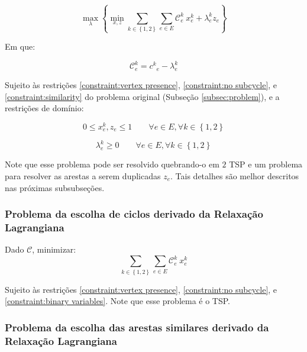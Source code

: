 \documentclass{article}
\newcommand{\subsecref}[1]{(Subseção \ref{#1})}
\newcommand{\Set}[1]{\ensuremath{\left\{#1\right\}}}
\newcommand{\Sum}[1]{\ensuremath{\displaystyle\sum\limits_{#1}}}
\newcommand{\edge}{\ensuremath{e}}
\newcommand{\edges}{\ensuremath{E}}
\newcommand{\ncycles}{2}
\newcommand{\allCycles}{\ensuremath{\Set{1, \ncycles}}}
\newcommand{\cycle}{\ensuremath{k}}
\newcommand{\cost}[1]{\ensuremath{c^{#1}}}
\newcommand{\costke}{\ensuremath{\cost{\cycle}_{\edge}}}
\newcommand{\Cost}{\ensuremath{\mathcal{C}}}
\newcommand{\Costke}{\ensuremath{\Cost^{\cycle}_{\edge}}}
\newcommand{\X}{\ensuremath{x}}
\newcommand{\xke}{\ensuremath{\X^{\cycle}_{\edge}}}
\newcommand{\Z}{\ensuremath{z}}
\newcommand{\ze}{\ensuremath{z_{\edge}}}
\newcommand{\lagrange}{\ensuremath{\lambda}}
\newcommand{\lagrangeke}{\ensuremath{\lagrange_{\edge}^{\cycle}}}
\begin{document}
\begin{equation}
    \label{eq:goal lagrangian}
	\max_{\lagrange}
	\left\{
		\min_{\X, \Z}
 		\Sum{\cycle \in \allCycles}
 		\Sum{\edge \in \edges}
 		\Costke \ \xke
 		+ \lagrangeke \ze
 	\right\}
\end{equation}

Em que:

\begin{equation}
	\Costke = \costke - \lagrangeke
\end{equation}

Sujeito às restrições \ref{constraint:vertex presence}, \ref{constraint:no subcycle}, e \ref{constraint:similarity} do problema original \subsecref{subsec:problem}, e a restrições de domínio:

\begin{equation}
	\label{constraint:value of variables}
	0 \leqslant \xke, \ze \leqslant 1
	\qquad
	\forall \edge \in \edges,
	\forall \cycle \in \allCycles
\end{equation}

\begin{equation}
	\label{constraint: lagrange}
	\lagrangeke \geqslant 0
	\qquad
	\forall \edge \in \edges,
	\forall \cycle \in \allCycles
\end{equation}

Note que esse problema pode ser resolvido quebrando-o em $\ncycles$ TSP e um problema para resolver as arestas a serem duplicadas $\ze$. Tais detalhes são melhor descritos nas próximas subsubseções.

\subsubsection{Problema da escolha de ciclos derivado da Relaxação Lagrangiana}

Dado $\Cost$, minimizar:
\begin{equation}
 	\Sum{\cycle \in \allCycles}
 	\Sum{\edge \in \edges}
 	\Costke \ \xke
\end{equation}

Sujeito às restrições \ref{constraint:vertex presence}, \ref{constraint:no subcycle}, e \ref{constraint:binary variables}. Note que esse problema é o TSP.

\subsubsection{Problema da escolha das arestas similares derivado da Relaxação Lagrangiana}
\label{subsec:z problem}
\end{document}
